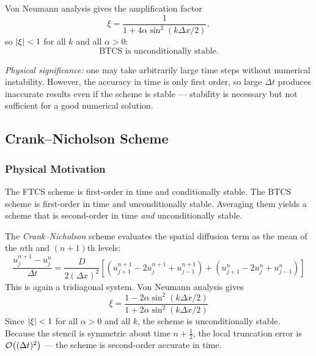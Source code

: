 Von Neumann analysis gives the amplification factor
\begin{equation}
  \xi = \frac{1}{1+4\alpha\sin^2(k\Delta x/2)},
  \label{eq:lec09:btcs-amplification}
\end{equation}
so $\left|\xi\right|<1$ for all $k$ and all $\alpha>0$:
\begin{equation}
  \boxed{\text{BTCS is unconditionally stable.}}
  \label{eq:lec09:btcs-stable}
\end{equation}

\textit{Physical significance:} one may take arbitrarily large time
steps without numerical instability.  However, the accuracy in time is
only first order, so large $\Delta t$ produces inaccurate results even
if the scheme is stable — stability is necessary but not sufficient for
a good numerical solution.

\subsection{Crank--Nicholson Scheme}\label{subsec:lec09:cn}

\subsubsection*{Physical Motivation}
The FTCS scheme is first-order in time and conditionally stable.
The BTCS scheme is first-order in time and unconditionally stable.
Averaging them yields a scheme that is second-order in time \emph{and}
unconditionally stable.

The \emph{Crank--Nicholson} scheme evaluates the spatial diffusion
term as the mean of the $n$th and $(n+1)$th levels:
\begin{equation}
  \boxed{
  \frac{u_j^{n+1}-u_j^{n}}{\Delta t}
  = \frac{D}{2(\Delta x)^2}
    \!\left[
      \left(u_{j+1}^{n+1}-2u_j^{n+1}+u_{j-1}^{n+1}\right)
      +\left(u_{j+1}^{n}-2u_j^{n}+u_{j-1}^{n}\right)
    \right]}
  \label{eq:lec09:cn}
\end{equation}
This is again a tridiagonal system.  Von Neumann analysis gives
\begin{equation}
  \boxed{
  \xi = \frac{1-2\alpha\sin^2(k\Delta x/2)}
             {1+2\alpha\sin^2(k\Delta x/2)}}
  \label{eq:lec09:cn-amplification}
\end{equation}
Since $\left|\xi\right|<1$ for all $\alpha>0$ and all $k$, the scheme is
unconditionally stable.  Because the stencil is symmetric about
time $n+\frac{1}{2}$, the local truncation error is $\mathcal{O}\!\left((\Delta t)^2\right)$
— the scheme is second-order accurate in time.

